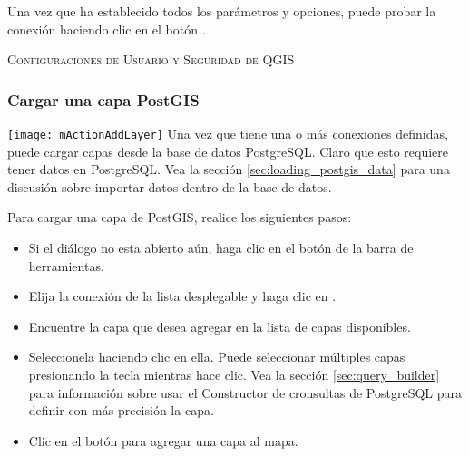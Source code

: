 Una vez que ha establecido todos los par\'ametros y opciones, puede probar la conexi\'on haciendo clic 
en el bot\'on  .

\begin{Tip}\caption{\textsc{Configuraciones de Usuario y Seguridad de QGIS}}
\end{Tip}

\subsubsection{Cargar una capa PostGIS}

\texttt{[image: mActionAddLayer]} Una vez que tiene una o más
conexiones definidas, puede cargar capas desde la base de datos PostgreSQL. Claro
que esto requiere tener datos en PostgreSQL. Vea la secci\'on
\ref{sec:loading_postgis_data} para una discusi\'on sobre importar datos dentro de la
base de datos. 

Para cargar una capa de PostGIS, realice los siguientes pasos:

\begin{itemize}
\item Si el di\'alogo  no esta abierto aún, haga clic en el bot\'on
 de la barra de herramientas.
\item Elija la conexi\'on de la lista desplegable y haga clic en .
\item Encuentre la capa que desea agregar en la lista de capas disponibles.
\item Seleccionela haciendo clic en ella. Puede seleccionar m\'ultiples capas presionando
la tecla  mientras hace clic. Vea la secci\'on \ref{sec:query_builder} para
informaci\'on sobre usar el Constructor de cronsultas de PostgreSQL para definir con más precisi\'on la capa.
\item Clic en el bot\'on  para agregar una capa al mapa.
\end{itemize}

